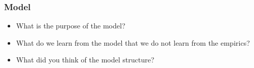 \documentclass[english,xcolor=svgnames]{beamer}
\begin{document}
\begin{frame}
	\frametitle[alignment=center]{Model}
	\begin{itemize}
		\item What is the purpose of the model?
		\item What do we learn from the model that we do not learn from the empirics?
		\item What did you think of the model structure?
	\end{itemize}
\end{frame}
\end{document}
